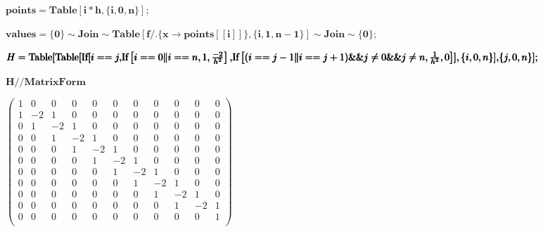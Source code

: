 \documentclass{article}
\begin{document}
\begin{doublespace}
\noindent\(\pmb{\text{points} = \text{Table}[i*h, \{i, 0, n\}];}\)
\end{doublespace}

\begin{doublespace}
\noindent\(\pmb{\text{values} = \{0\}\sim \text{Join}\sim \text{Table}[f\text{/.}\{ x\to  \text{points}[[i]]\}, \{i, 1, n-1\}]\sim \text{Join}\sim
\{0\} ;}\)
\end{doublespace}

\begin{doublespace}
\noindent\(\pmb{H = \text{Table}[}\\
\pmb{\text{Table}[}\\
\pmb{\text{If} [i == j, }\\
\pmb{\text{If}\left[i == 0 \| i== n, 1,\frac{-2}{h^2}\right],}\\
\pmb{\text{If}\left[(i == j-1 \| i== j+1)\&\&j\neq  0 \&\& j\neq  n , \frac{1}{h^2}, 0 \right]}\\
\pmb{]}\\
\pmb{, \{i, 0, n\}],}\\
\pmb{\{j, 0, n\}}\\
\pmb{];}\)
\end{doublespace}

\begin{doublespace}
\noindent\(\pmb{H \text{//} \text{MatrixForm}}\)
\end{doublespace}

\begin{doublespace}
\noindent\(\left(
\begin{array}{ccccccccccc}
 1 & 0 & 0 & 0 & 0 & 0 & 0 & 0 & 0 & 0 & 0 \\
 1 & -2 & 1 & 0 & 0 & 0 & 0 & 0 & 0 & 0 & 0 \\
 0 & 1 & -2 & 1 & 0 & 0 & 0 & 0 & 0 & 0 & 0 \\
 0 & 0 & 1 & -2 & 1 & 0 & 0 & 0 & 0 & 0 & 0 \\
 0 & 0 & 0 & 1 & -2 & 1 & 0 & 0 & 0 & 0 & 0 \\
 0 & 0 & 0 & 0 & 1 & -2 & 1 & 0 & 0 & 0 & 0 \\
 0 & 0 & 0 & 0 & 0 & 1 & -2 & 1 & 0 & 0 & 0 \\
 0 & 0 & 0 & 0 & 0 & 0 & 1 & -2 & 1 & 0 & 0 \\
 0 & 0 & 0 & 0 & 0 & 0 & 0 & 1 & -2 & 1 & 0 \\
 0 & 0 & 0 & 0 & 0 & 0 & 0 & 0 & 1 & -2 & 1 \\
 0 & 0 & 0 & 0 & 0 & 0 & 0 & 0 & 0 & 0 & 1 \\
\end{array}
\right)\)
\end{doublespace}
\end{document}
